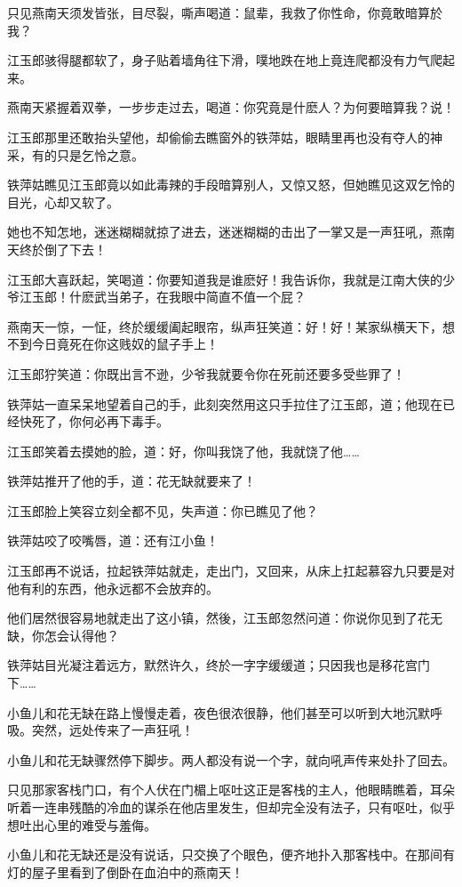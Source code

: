 \documentclass[12pt,oneside]{book}
\begin{document}
只见燕南天须发皆张，目尽裂，嘶声喝道：鼠辈，我救了你性命，你竟敢暗算於我？

江玉郎骇得腿都软了，身子贴着墙角往下滑，噗地跌在地上竟连爬都没有力气爬起来。

燕南天紧握着双拳，一步步走过去，喝道：你究竟是什麽人？为何要暗算我？说！

江玉郎那里还敢抬头望他，却偷偷去瞧窗外的铁萍姑，眼睛里再也没有夺人的神采，有的只是乞怜之意。

铁萍姑瞧见江玉郎竟以如此毒辣的手段暗算别人，又惊又怒，但她瞧见这双乞怜的目光，心却又软了。

她也不知怎地，迷迷糊糊就掠了进去，迷迷糊糊的击出了一掌又是一声狂吼，燕南天终於倒了下去！

江玉郎大喜跃起，笑喝道：你要知道我是谁麽好！我告诉你，我就是江南大侠的少爷江玉郎！什麽武当弟子，在我眼中简直不值一个屁？

燕南天一惊，一怔，终於缓缓阖起眼帘，纵声狂笑道：好！好！某家纵横天下，想不到今日竟死在你这贱奴的鼠子手上！

江玉郎狞笑道：你既出言不逊，少爷我就要令你在死前还要多受些罪了！

铁萍姑一直呆呆地望着自己的手，此刻突然用这只手拉住了江玉郎，道；他现在已经快死了，你何必再下毒手。

江玉郎笑着去摸她的脸，道：好，你叫我饶了他，我就饶了他\ldots\ldots{}

铁萍姑推开了他的手，道：花无缺就要来了！

江玉郎脸上笑容立刻全都不见，失声道：你已瞧见了他？

铁萍姑咬了咬嘴唇，道：还有江小鱼！

江玉郎再不说话，拉起铁萍姑就走，走出门，又回来，从床上扛起慕容九只要是对他有利的东西，他永远都不会放弃的。

他们居然很容易地就走出了这小镇，然後，江玉郎忽然问道：你说你见到了花无缺，你怎会认得他？

铁萍姑目光凝注着远方，默然许久，终於一字字缓缓道；只因我也是移花宫门下\ldots\ldots{}

小鱼儿和花无缺在路上慢慢走着，夜色很浓很静，他们甚至可以听到大地沉默呼吸。突然，远处传来了一声狂吼！

小鱼儿和花无缺骤然停下脚步。两人都没有说一个字，就向吼声传来处扑了回去。

只见那家客栈门口，有个人伏在门楣上呕吐这正是客栈的主人，他眼睛瞧着，耳朵听着一连串残酷的冷血的谋杀在他店里发生，但却完全没有法子，只有呕吐，似乎想吐出心里的难受与羞侮。

小鱼儿和花无缺还是没有说话，只交换了个眼色，便齐地扑入那客栈中。在那间有灯的屋子里看到了倒卧在血泊中的燕南天！
\end{document}
